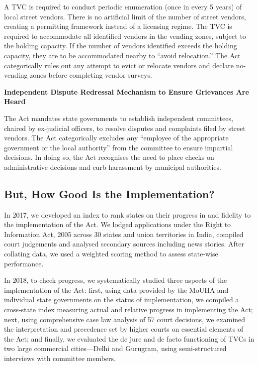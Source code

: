 \documentclass[a4paper, 12pt, twoside]{article}
\begin{document}
{A TVC is required to conduct periodic enumeration (once in every 5 years) of local street vendors. There is no artificial limit of the number of street vendors, creating a permitting framework instead of a licensing regime. The TVC is required to accommodate all identified vendors in the vending zones, subject to the holding capacity. If the number of vendors identified exceeds the holding capacity, they are to be accommodated nearby to “avoid relocation.” The Act categorically rules out any attempt to evict or relocate vendors and declare no-vending zones before completing vendor surveys.

\textbf{Independent Dispute Redressal Mechanism to Ensure Grievances Are Heard}

The Act mandates state governments to establish independent committees, chaired by ex-judicial officers, to resolve disputes and complaints filed by street vendors. The Act categorically excludes any “employee of the appropriate government or the local authority” from the committee to ensure impartial decisions. In doing so, the Act recognises the need to place checks on administrative decisions and curb harassment by municipal authorities.

\subsection*{But, How Good Is the Implementation?}

In 2017, we developed an index to rank states on their progress in and fidelity to the implementation of the Act. We lodged applications under the Right to Information Act, 2005 across 30 states and union territories in India, compiled court judgements and analysed secondary sources including news stories. After collating data, we used a weighted scoring method to assess state-wise performance.

In 2018, to check progress, we systematically studied three aspects of the implementation of the Act: first, using data provided by the MoUHA and individual state governments on the status of implementation, we compiled a cross-state index measuring actual and relative progress in implementing the Act; next, using comprehensive case law analysis of 57 court decisions, we examined the interpretation and precedence set by higher courts on essential elements of the Act; and finally, we evaluated the de jure and de facto functioning of TVCs in two large commercial cities—Delhi and Gurugram, using semi-structured interviews with committee members.

}
\end{document}
